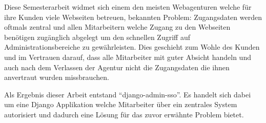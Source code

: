 Diese Semesterarbeit widmet sich einem den meisten Webagenturen welche für ihre Kunden viele Webseiten betreuen, bekannten Problem: Zugangsdaten werden oftmals zentral und allen Mitarbeitern welche Zugang zu den Webseiten benötigen zugänglich abgelegt um den schnellen Zugriff auf Administrationsbereiche zu gewährleisten. Dies geschieht zum Wohle des Kunden und im Vertrauen darauf, dass alle Mitarbeiter mit guter Absicht handeln und auch nach dem Verlassen der Agentur nicht die Zugangsdaten die ihnen anvertraut wurden missbrauchen.

Als Ergebnis dieser Arbeit entstand ``django-admin-sso''. Es handelt sich dabei um eine Django Applikation welche Mitarbeiter über ein zentrales System autorisiert und dadurch eine Lösung für das zuvor erwähnte Problem bietet.
